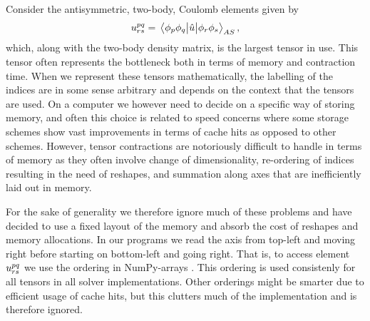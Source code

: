         Consider the antisymmetric, two-body, Coulomb elements given by
        \begin{align}
            u^{pq}_{rs}
            = \mel{\phi_p\phi_q}{\hat{u}}{\phi_r\phi_s}_{AS},
        \end{align}
        which, along with the two-body density matrix, is the largest tensor in
        use.
        This tensor often represents the bottleneck both in terms of memory and
        contraction time.
        When we represent these tensors mathematically, the labelling of the
        indices are in some sense arbitrary and depends on the context that the
        tensors are used.
        On a computer we however need to decide on a specific way of storing
        memory, and often this choice is related to speed concerns where some
        storage schemes show vast improvements in terms of cache hits as opposed
        to other schemes.
        However, tensor contractions are notoriously difficult to handle in
        terms of memory as they often involve change of dimensionality,
        re-ordering of indices resulting in the need of reshapes, and summation
        along axes that are inefficiently laid out in memory.

        For the sake of generality we therefore ignore much of these problems
        and have decided to use a fixed layout of the memory and absorb the cost
        of reshapes and memory allocations.
        In our programs we read the axis from top-left and moving right before
        starting on bottom-left and going right.
        That is, to access element $u^{pq}_{rs}$ we use the ordering
         in NumPy-arrays \cite{numpy}.
        This ordering is used consistenly for all tensors in all solver
        implementations.
        Other orderings might be smarter due to efficient usage of cache hits,
        but this clutters much of the implementation and is therefore ignored.

